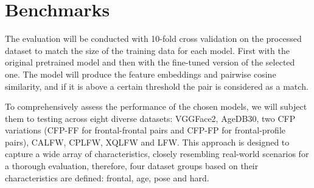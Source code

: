 \documentclass[class=report, crop=false, a4paper, 12pt]{standalone}
\begin{document}
\section{Benchmarks}
\par The evaluation will be conducted with 10-fold cross validation on the processed dataset to match the size of the training data for each model. First with the original pretrained model and then with the fine-tuned version of the selected one. The model will produce the feature embeddings and pairwise cosine similarity, and if it is above a certain threshold the pair is considered as a match. 

\par To comprehensively assess the performance of the chosen models, we will subject them to testing across eight diverse datasets: VGGFace2, AgeDB30, two CFP variations (CFP-FF for frontal-frontal pairs and CFP-FP for frontal-profile pairs), CALFW, CPLFW, XQLFW and LFW. This approach is designed to capture a wide array of characteristics, closely resembling real-world scenarios for a thorough evaluation, therefore, four dataset groups based on their characteristics are defined: frontal, age, pose and hard. 
\end{document}
